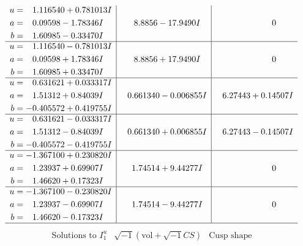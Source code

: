 \documentclass[1p]{elsarticle_modified}
\theoremstyle{definition}
\newcommand{\I}{\sqrt{-1}}
\begin{document}
$$\begin{array}{c|c|c}
\begin{aligned}
u &= \phantom{-}1.116540 + 0.781013 I \\
a &= \phantom{-}0.09598 - 1.78346 I \\
b &= \phantom{-}1.60985 - 0.33470 I\end{aligned}
 & \phantom{-}8.8856 - 17.9490 I & \phantom{-0.000000 } 0 \\ \hline\begin{aligned}
u &= \phantom{-}1.116540 - 0.781013 I \\
a &= \phantom{-}0.09598 + 1.78346 I \\
b &= \phantom{-}1.60985 + 0.33470 I\end{aligned}
 & \phantom{-}8.8856 + 17.9490 I & \phantom{-0.000000 } 0 \\ \hline\begin{aligned}
u &= \phantom{-}0.631621 + 0.033317 I \\
a &= \phantom{-}1.51312 + 0.84039 I \\
b &= -0.405572 + 0.419755 I\end{aligned}
 & \phantom{-}0.661340 - 0.006855 I & \phantom{-}6.27443 + 0.14507 I \\ \hline\begin{aligned}
u &= \phantom{-}0.631621 - 0.033317 I \\
a &= \phantom{-}1.51312 - 0.84039 I \\
b &= -0.405572 - 0.419755 I\end{aligned}
 & \phantom{-}0.661340 + 0.006855 I & \phantom{-}6.27443 - 0.14507 I \\ \hline\begin{aligned}
u &= -1.367100 + 0.230820 I \\
a &= \phantom{-}1.23937 + 0.69907 I \\
b &= \phantom{-}1.46620 + 0.17323 I\end{aligned}
 & \phantom{-}1.74514 + 9.44277 I & \phantom{-0.000000 } 0 \\ \hline\begin{aligned}
u &= -1.367100 - 0.230820 I \\
a &= \phantom{-}1.23937 - 0.69907 I \\
b &= \phantom{-}1.46620 - 0.17323 I\end{aligned}
 & \phantom{-}1.74514 - 9.44277 I & \phantom{-0.000000 } 0\\
 \hline 
 \end{array}$$\newpage$$\begin{array}{c|c|c}  
\text{Solutions to }I^u_{1}& \I (\text{vol} + \sqrt{-1}CS) & \text{Cusp shape}\\

\end{array}$$
\end{document}
